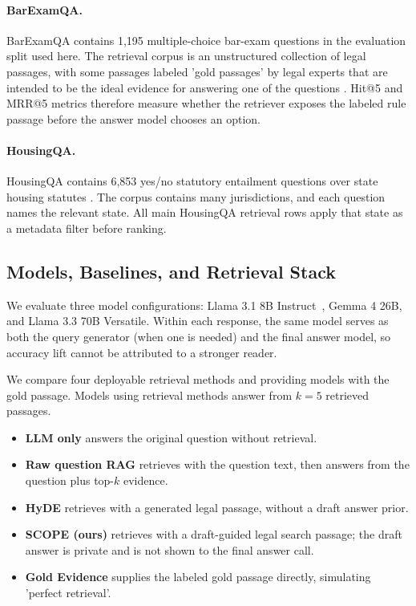 \paragraph{BarExamQA.}
BarExamQA contains 1,195 multiple-choice bar-exam questions in the evaluation
split used here. The retrieval corpus is an unstructured collection of legal passages, with some passages labeled 'gold passages' by legal experts that are intended to be the ideal evidence for answering one of the questions \cite{Zheng_2025}. Hit@5 and MRR@5 metrics therefore measure whether the
retriever exposes the labeled rule passage before the answer model chooses an
option.

\paragraph{HousingQA.}
HousingQA contains 6,853 yes/no statutory entailment questions over state
housing statutes \cite{Zheng_2025}. The corpus contains many jurisdictions, and each question
names the relevant state. All main HousingQA retrieval rows apply that state
as a metadata filter before ranking. 


\subsection{Models, Baselines, and Retrieval Stack}

We evaluate three model configurations: Llama 3.1 8B Instruct~\cite{grattafiori2024llama3herdmodels}, Gemma 4 26B, and Llama 3.3 70B Versatile. Within each response, the same model serves as both the query generator (when one is needed) and the final answer model, so accuracy lift cannot be attributed to a stronger reader.

We compare four deployable retrieval methods and providing models with the gold passage. Models using retrieval methods answer from $k=5$ retrieved passages.

\begin{itemize}
\item \textbf{LLM only} answers the original question without retrieval.
\item \textbf{Raw question RAG} retrieves with the question text, then
answers from the question plus top-$k$ evidence.
\item \textbf{HyDE} retrieves with a generated legal passage, without a
draft answer prior.
\item \textbf{SCOPE (ours)} retrieves with a draft-guided legal search
passage; the draft answer is private and is not shown to the final answer
call.
\item \textbf{Gold Evidence} supplies the labeled gold passage directly, simulating 'perfect retrieval'.
\end{itemize}

